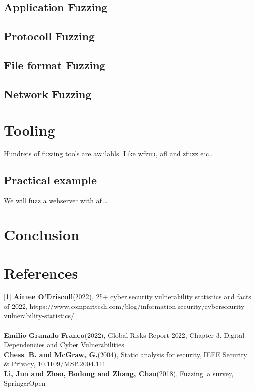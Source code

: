 \documentclass[journal=tosc,final]{iacrtrans}
\begin{document}
\subsection{Application Fuzzing}

\subsection{Protocoll Fuzzing}
\subsection{File format Fuzzing}
\subsection{Network Fuzzing}
\newpage
\section{Tooling}
Hundrets of fuzzing tools are availabls. Like wfzuu, afl and zfuzz etc..
\subsection{Practical example}
We will fuzz a webserver with afl\dots
\section{Conclusion}




\section{References}
[1] \textbf{Aimee O'Driscoll}(2022), 25+ cyber security vulnerability statistics and facts of 2022, https://www.comparitech.com/blog/information-security/cybersecurity-vulnerability-statistics/\\
\\
\noindent[2] \textbf{Emilio Granado Franco}(2022),  Global Risks Report 2022, Chapter 3. Digital Dependencies and Cyber Vulnerabilities\\

\noindent[3] \textbf{Chess, B. and McGraw, G.}(2004), Static analysis for security, IEEE Security \& Privacy, 10.1109/MSP.2004.111
\\


\noindent[4] \textbf{Li, Jun and Zhao, Bodong and Zhang, Chao}(2018),     Fuzzing: a survey, SpringerOpen
\\
\end{document}
